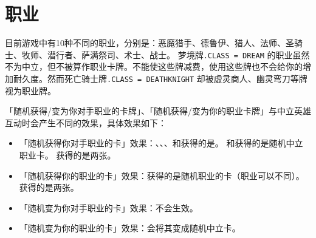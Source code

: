 
\section{职业}

目前游戏中有10种不同的职业，分别是：恶魔猎手、德鲁伊、猎人、法师、圣骑士、牧师、潜行者、萨满祭司、术士、战士。
\notice 梦境牌\texttt{.CLASS = DREAM} 的职业虽然不为中立，但不被算作职业卡牌。不能使这些牌减费，使用这些牌也不会给你的增加耐久度。然而死亡骑士牌\texttt{.CLASS = DEATHKNIGHT} 却被虚灵商人、幽灵弯刀等牌视为职业牌。

「随机获得/变为你对手职业的卡牌」、「随机获得/变为你的职业卡牌」与中立英雄互动时会产生不同的效果，具体效果如下：
\begin{itemize}
    \item 「随机获得你对手职业的卡」效果：、、、和获得的是。
        \exception {}和获得的是随机中立职业卡。
        \exception {}获得的是两张。
    \item 「随机获得你的职业的卡」效果：获得的是随机职业的卡（职业可以不同）。
        \exception {}获得的是两张。
    \item 「随机变为你对手职业的卡」效果：不会生效。
    \item 「随机变为你的职业的卡」效果：会将其变成随机中立卡。
\end{itemize}
